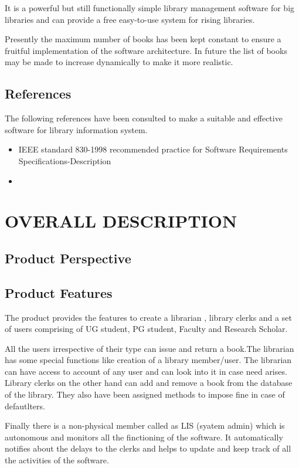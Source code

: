 \documentclass{article}
\begin{document}
It is a powerful but still functionally simple library management software for big libraries and can provide a free easy-to-use system for rising libraries.

Presently the maximum number of books has been kept constant to ensure a fruitful implementation of the software architecture. In future the list of books may be made to increase dynamically to make it more realistic.
\subsection{References}
The following references have been consulted to make a suitable and effective software for library information system.

\begin{itemize}
\item IEEE standard 830-1998 recommended practice for Software Requirements Specifications-Description
\item 
\end{itemize}


\section{OVERALL DESCRIPTION}
\subsection{Product Perspective}

\subsection{Product Features}
The product provides the features to create a librarian , library clerks and a set of users comprising of UG student, PG student, Faculty and Research Scholar.

All the users irrespective of their type can issue and return a book.The librarian has some special functions like creation of a library member/user. The librarian can have access to account of any user and can look into it in case need arises.
Library clerks on the other hand can add and remove a book from the database of the library. They also have been assigned methods to impose fine in case of defautlters.

Finally there is a non-physical member called as LIS (syatem admin) which is autonomous and monitors all the finctioning of the software. It automatically notifies about the delays to the clerks and helps to update and keep track of all the activities of the software.
\end{document}

